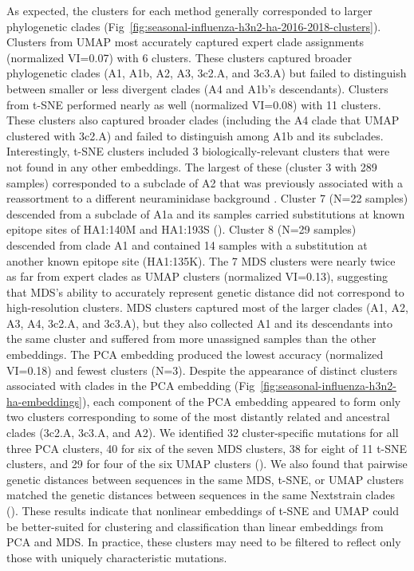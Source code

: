\documentclass[10pt,letterpaper]{article}
\begin{document}
As expected, the clusters for each method generally corresponded to larger phylogenetic clades (Fig~\ref{fig:seasonal-influenza-h3n2-ha-2016-2018-clusters}).
Clusters from UMAP most accurately captured expert clade assignments (normalized VI=0.07) with 6 clusters.
These clusters captured broader phylogenetic clades (A1, A1b, A2, A3, 3c2.A, and 3c3.A) but failed to distinguish between smaller or less divergent clades (A4 and A1b's descendants).
Clusters from t-SNE performed nearly as well (normalized VI=0.08) with 11 clusters.
These clusters also captured broader clades (including the A4 clade that UMAP clustered with 3c2.A) and failed to distinguish among A1b and its subclades.
Interestingly, t-SNE clusters included 3 biologically-relevant clusters that were not found in any other embeddings.
The largest of these (cluster 3 with 289 samples) corresponded to a subclade of A2 that was previously associated with a reassortment to a different neuraminidase background \cite{Potter2019}.
Cluster 7 (N=22 samples) descended from a subclade of A1a and its samples carried substitutions at known epitope sites of HA1:140M and HA1:193S ().
Cluster 8 (N=29 samples) descended from clade A1 and contained 14 samples with a substitution at another known epitope site (HA1:135K).
The 7 MDS clusters were nearly twice as far from expert clades as UMAP clusters (normalized VI=0.13), suggesting that MDS's ability to accurately represent genetic distance did not correspond to high-resolution clusters.
MDS clusters captured most of the larger clades (A1, A2, A3, A4, 3c2.A, and 3c3.A), but they also collected A1 and its descendants into the same cluster and suffered from more unassigned samples than the other embeddings.
The PCA embedding produced the lowest accuracy (normalized VI=0.18) and fewest clusters (N=3).
Despite the appearance of distinct clusters associated with clades in the PCA embedding (Fig~\ref{fig:seasonal-influenza-h3n2-ha-embeddings}), each component of the PCA embedding appeared to form only two clusters corresponding to some of the most distantly related and ancestral clades (3c2.A, 3c3.A, and A2).
We identified 32 cluster-specific mutations for all three PCA clusters, 40 for six of the seven MDS clusters, 38 for eight of 11 t-SNE clusters, and 29 for four of the six UMAP clusters ().
We also found that pairwise genetic distances between sequences in the same MDS, t-SNE, or UMAP clusters matched the genetic distances between sequences in the same Nextstrain clades ().
These results indicate that nonlinear embeddings of t-SNE and UMAP could be better-suited for clustering and classification than linear embeddings from PCA and MDS.
In practice, these clusters may need to be filtered to reflect only those with uniquely characteristic mutations.
\end{document}
